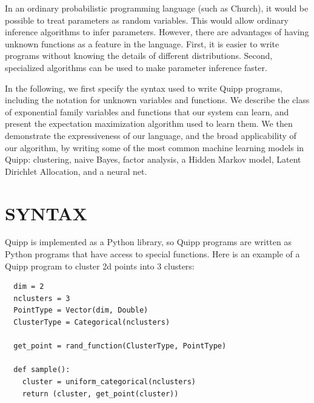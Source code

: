 \documentclass[proceed]{article}
\begin{document}

  In an ordinary probabilistic programming language (such as Church),
  it would be possible to treat parameters as random variables.  This
  would allow ordinary inference algorithms to infer parameters.  However,
  there are advantages of having unknown functions as a feature
  in the language.
  First, it is easier to
  write programs without knowing the details of different distributions.
  Second, specialized algorithms can be used to make parameter inference
  faster.



  In the following, we first specify the syntax used to write Quipp programs,
  including the notation for unknown variables and functions.
  We describe the class of exponential family variables and functions that our system can learn,
  and present the expectation maximization algorithm used to learn them.
  We then demonstrate the expressiveness of our language, and the broad
  applicability of our algorithm, by writing some of the most common machine learning models
  in Quipp: clustering, naive Bayes, factor analysis, a Hidden Markov model, Latent Dirichlet Allocation, and
  a neural net.
  
  \section{SYNTAX}

  Quipp is implemented as a Python library, so Quipp programs are written as Python programs that have access
  to special functions.  Here is an example of a Quipp program to cluster 2d points into 3 clusters:


  \begin{verbatim}
  dim = 2
  nclusters = 3
  PointType = Vector(dim, Double)
  ClusterType = Categorical(nclusters)

  get_point = rand_function(ClusterType, PointType)

  def sample():
    cluster = uniform_categorical(nclusters)
    return (cluster, get_point(cluster))
  \end{verbatim}
\end{document}
